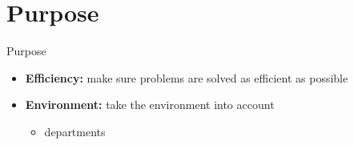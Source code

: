\section{Purpose}
\begin{frame}{Purpose}

\begin{itemize}
	\item \textbf{Efficiency:} make sure problems are solved as efficient as possible
	\item \textbf{Environment:} take the environment into account
	\begin{itemize}
		\item departments
	\end{itemize}
\end{itemize}


\end{frame}
